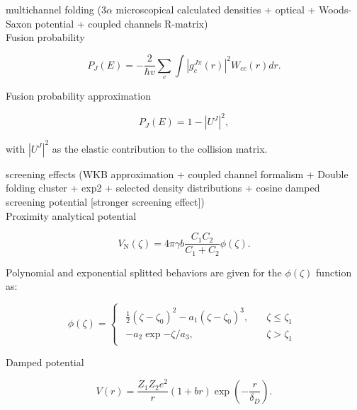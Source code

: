 \documentclass[openany]{book}
\begin{document}
multichannel folding ($3\alpha$ microscopical calculated densities + optical + Woods-Saxon potential + coupled channels R-matrix) \cite{assuncao_descouvemont_2016} \\

Fusion probability 

\begin{equation}\label{eq:middleFusion_fusion_probability}
	P_J(E) = - \frac{2}{\hbar v} \sum_{c} \int {|g^{J\pi}_c(r)|^2 W_{cc}(r) dr}.
\end{equation}

Fusion probability approximation

\begin{equation}\label{eq:middleFusion_fusion_probability_approximation}
	P_J(E) = 1 - |U^{J}|^2,
\end{equation}

with $ |U^{J}|^2$ as the elastic contribution to the collision matrix.

screening effects (WKB approximation + coupled channel formalism + Double folding cluster + exp2 + selected density distributions + cosine damped screening potential [stronger screening effect]) \cite{koyuncu_soylu_2018} \\

Proximity analytical potential 

\begin{equation}\label{eq:middleFusion_analytical_proximity}
	V_{\mathrm{N}}(\zeta) = 4\pi\gamma b \frac{C_1C_2}{C_1 + C_2} \phi(\zeta).
\end{equation}

Polynomial and exponential splitted behaviors are given for the 
$\phi(\zeta)$ function as: 

\begin{equation} \label{eq:middleFusion_analytical_proximity_phi}
		\phi (\zeta) = 	\left\{\begin{array}{l}
		\begin{split}
			\frac{1}{2}(\zeta - \zeta_0)^2 - a_1(\zeta - \zeta_0)^3, \quad & \zeta \le \zeta_1 \\ 
			-a_2\exp {-\zeta/a_3}, \quad & \zeta > \zeta_1
		\end{split}
	\end{array}\right.
\end{equation}

Damped potential 

\begin{equation}\label{eq:middleFusion_screening_dampedPotential}
	V(r) = \frac{Z_1Z_2 e^2}{r}(1+ br)\exp {\left(-\frac{r}{\delta_D}\right)}.
\end{equation}
\end{document}
